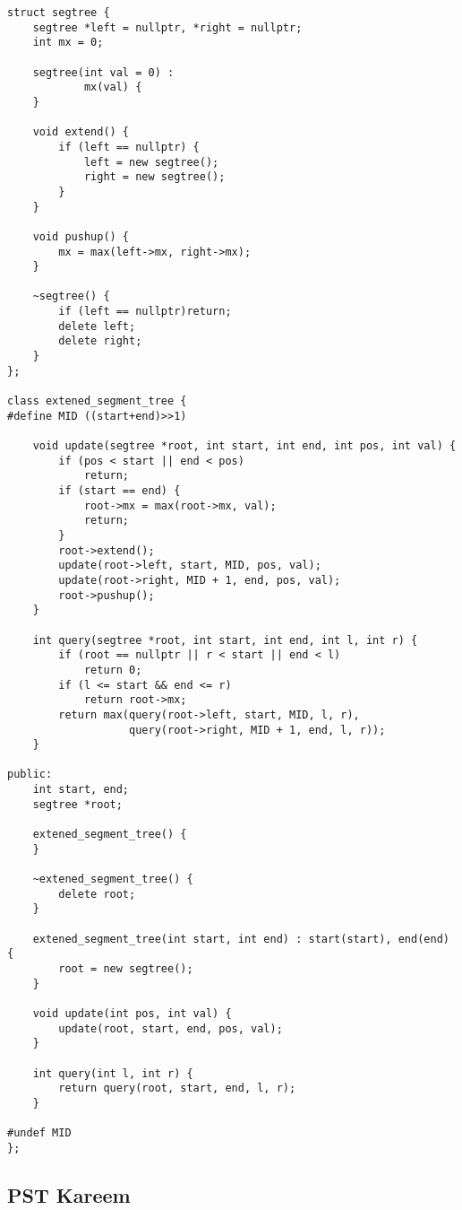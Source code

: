\begin{lstlisting}[style=cpp]
struct segtree {  
    segtree *left = nullptr, *right = nullptr;  
    int mx = 0;  
  
    segtree(int val = 0) :  
            mx(val) {  
    }  
  
    void extend() {  
        if (left == nullptr) {  
            left = new segtree();  
            right = new segtree();  
        }  
    }  
  
    void pushup() {  
        mx = max(left->mx, right->mx);  
    }  
  
    ~segtree() {  
        if (left == nullptr)return;  
        delete left;  
        delete right;  
    }  
};  
  
class extened_segment_tree {  
#define MID ((start+end)>>1)  
  
    void update(segtree *root, int start, int end, int pos, int val) {  
        if (pos < start || end < pos)  
            return;  
        if (start == end) {  
            root->mx = max(root->mx, val);  
            return;  
        }  
        root->extend();  
        update(root->left, start, MID, pos, val);  
        update(root->right, MID + 1, end, pos, val);  
        root->pushup();  
    }  
  
    int query(segtree *root, int start, int end, int l, int r) {  
        if (root == nullptr || r < start || end < l)  
            return 0;  
        if (l <= start && end <= r)  
            return root->mx;  
        return max(query(root->left, start, MID, l, r),  
                   query(root->right, MID + 1, end, l, r));  
    }  
  
public:  
    int start, end;  
    segtree *root;  
  
    extened_segment_tree() {  
    }  
  
    ~extened_segment_tree() {  
        delete root;  
    }  
  
    extened_segment_tree(int start, int end) : start(start), end(end) {  
        root = new segtree();  
    }  
  
    void update(int pos, int val) {  
        update(root, start, end, pos, val);  
    }  
  
    int query(int l, int r) {  
        return query(root, start, end, l, r);  
    }  
  
#undef MID  
};
\end{lstlisting}

\subsection{PST Kareem}

